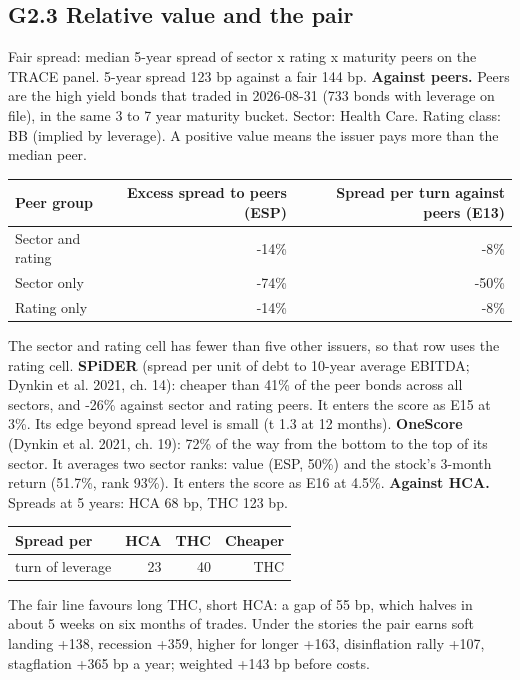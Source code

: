\documentclass[11pt,a4paper]{article}
\begin{document}
\subsection*{G2.3 Relative value and the pair}
Fair spread: median 5-year spread of sector x rating x maturity peers on the TRACE panel. 5-year spread 123 bp against a fair 144 bp.
\textbf{Against peers.} Peers are the high yield bonds that traded in 2026-08-31 (733 bonds with leverage on file), in the same 3 to 7 year maturity bucket. Sector: Health Care. Rating class: BB (implied by leverage). A positive value means the issuer pays more than the median peer.
\begin{center}\footnotesize\setlength{\tabcolsep}{3.5pt}\begin{tabular}{@{}lrr@{}}\toprule
Peer group & Excess spread to peers (ESP) & Spread per turn against peers (E13) \\\midrule
Sector and rating & -14\% & -8\% \\
Sector only & -74\% & -50\% \\
Rating only & -14\% & -8\% \\
\bottomrule\end{tabular}\end{center}
The sector and rating cell has fewer than five other issuers, so that row uses the rating cell.
\textbf{SPiDER} (spread per unit of debt to 10-year average EBITDA; Dynkin et al. 2021, ch. 14): cheaper than 41\% of the peer bonds across all sectors, and -26\% against sector and rating peers. It enters the score as E15 at 3\%. Its edge beyond spread level is small (t 1.3 at 12 months).
\textbf{OneScore} (Dynkin et al. 2021, ch. 19): 72\% of the way from the bottom to the top of its sector. It averages two sector ranks: value (ESP, 50\%) and the stock's 3-month return (51.7\%, rank 93\%). It enters the score as E16 at 4.5\%.
\textbf{Against HCA.} Spreads at 5 years: HCA 68 bp, THC 123 bp.
\begin{center}\footnotesize\setlength{\tabcolsep}{3.5pt}\begin{tabular}{@{}lrrr@{}}\toprule
Spread per & HCA & THC & Cheaper \\\midrule
turn of leverage & 23 & 40 & THC \\
\bottomrule\end{tabular}\end{center}
The fair line favours long THC, short HCA: a gap of 55 bp, which halves in about 5 weeks on six months of trades. Under the stories the pair earns soft landing +138, recession +359, higher for longer +163, disinflation rally +107, stagflation +365 bp a year; weighted +143 bp before costs.
\end{document}
